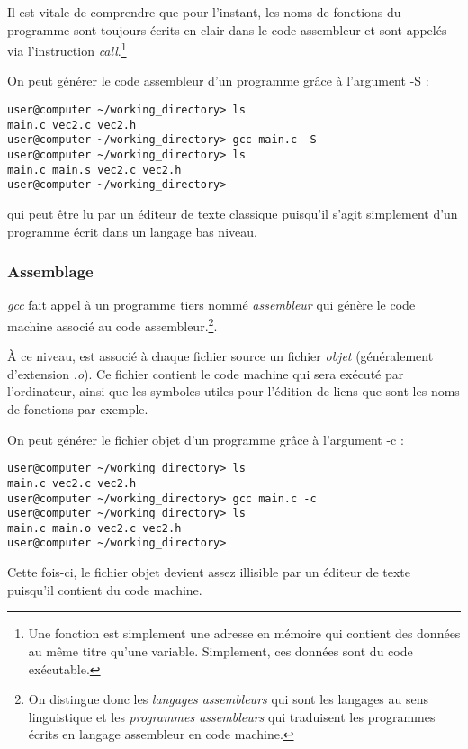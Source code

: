 \documentclass[../../../main.tex]{subfiles}
\begin{document}
Il est vitale de comprendre que pour l'instant, les noms de fonctions du programme sont toujours écrits en clair dans le code assembleur et sont appelés via l'instruction \textit{call}.\footnote{Une fonction est simplement une adresse en mémoire qui contient des données au même titre qu'une variable. Simplement, ces données sont du code exécutable.}

On peut générer le code assembleur d'un programme grâce à l'argument \textsf{-S} :
\begin{verbatim}
user@computer ~/working_directory> ls
main.c vec2.c vec2.h
user@computer ~/working_directory> gcc main.c -S
user@computer ~/working_directory> ls
main.c main.s vec2.c vec2.h
user@computer ~/working_directory>
\end{verbatim}
qui peut être lu par un éditeur de texte classique puisqu'il s'agit simplement d'un programme écrit dans un langage bas niveau.
\subsubsection{Assemblage}
\label{ssub:assemblage}
\textit{gcc} fait appel à un programme tiers nommé \textit{assembleur} qui génère le code machine associé au code assembleur.\footnote{On distingue donc les \textit{langages assembleurs} qui sont les langages au sens linguistique et les \textit{programmes assembleurs} qui traduisent les programmes écrits en langage assembleur en code machine.}.
 
À ce niveau, est associé à chaque fichier source un fichier \textit{objet} (généralement d'extension \textit{.o}). Ce fichier contient le code machine qui sera exécuté par l'ordinateur, ainsi que les symboles utiles pour l'édition de liens que sont les noms de fonctions par exemple.

\begin{minipage}{\textwidth}
	\begin{center}
		
	\end{center}
\end{minipage}
 
On peut générer le fichier objet d'un programme grâce à l'argument \textsf{-c} :
\begin{verbatim}
user@computer ~/working_directory> ls
main.c vec2.c vec2.h
user@computer ~/working_directory> gcc main.c -c
user@computer ~/working_directory> ls
main.c main.o vec2.c vec2.h
user@computer ~/working_directory>
\end{verbatim}
Cette fois-ci, le fichier objet devient assez illisible par un éditeur de texte puisqu'il contient du code machine.
\end{document}
